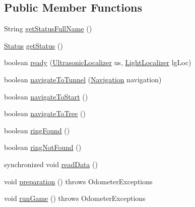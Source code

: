 \subsection*{Public Member Functions}
\begin{DoxyCompactItemize}
\item 
String \hyperlink{enumca_1_1mcgill_1_1ecse211_1_1project_1_1_game_a43a5763d183e0bcacd402c872c07273e}{get\+Status\+Full\+Name} ()
\item 
\hyperlink{enumca_1_1mcgill_1_1ecse211_1_1project_1_1_game_1_1_status}{Status} \hyperlink{enumca_1_1mcgill_1_1ecse211_1_1project_1_1_game_a620374b3eeb3dd7e0abd26f3ced9053b}{get\+Status} ()
\item 
boolean \hyperlink{enumca_1_1mcgill_1_1ecse211_1_1project_1_1_game_a5b304a6a59ddee3f8c7d37bba8a4c129}{ready} (\hyperlink{classca_1_1mcgill_1_1ecse211_1_1localization_1_1_ultrasonic_localizer}{Ultrasonic\+Localizer} us, \hyperlink{classca_1_1mcgill_1_1ecse211_1_1localization_1_1_light_localizer}{Light\+Localizer} lg\+Loc)
\item 
boolean \hyperlink{enumca_1_1mcgill_1_1ecse211_1_1project_1_1_game_af5cb4d96a0075ef2d4ab5e0be90b8875}{navigate\+To\+Tunnel} (\hyperlink{classca_1_1mcgill_1_1ecse211_1_1project_1_1_navigation}{Navigation} navigation)
\item 
boolean \hyperlink{enumca_1_1mcgill_1_1ecse211_1_1project_1_1_game_a863962c648d0aaab59e870dea837780f}{navigate\+To\+Start} ()
\item 
boolean \hyperlink{enumca_1_1mcgill_1_1ecse211_1_1project_1_1_game_a62445c3fa08038f033d4bf8c17021eca}{navigate\+To\+Tree} ()
\item 
boolean \hyperlink{enumca_1_1mcgill_1_1ecse211_1_1project_1_1_game_a62d510506f1b829fe67dea7270e5b889}{ring\+Found} ()
\item 
boolean \hyperlink{enumca_1_1mcgill_1_1ecse211_1_1project_1_1_game_adc2725f291b0688a62f85db1df1ee2b2}{ring\+Not\+Found} ()
\item 
synchronized void \hyperlink{enumca_1_1mcgill_1_1ecse211_1_1project_1_1_game_ab28110fca0af679acdaea84025746f15}{read\+Data} ()
\item 
void \hyperlink{enumca_1_1mcgill_1_1ecse211_1_1project_1_1_game_a8f3c5b18f98ee56f5f03afd72fa40bcb}{preparation} ()  throws Odometer\+Exceptions 
\item 
void \hyperlink{enumca_1_1mcgill_1_1ecse211_1_1project_1_1_game_adf69abe44e952d627fb9e6a2f678cb5e}{run\+Game} ()  throws Odometer\+Exceptions 
\end{DoxyCompactItemize}
